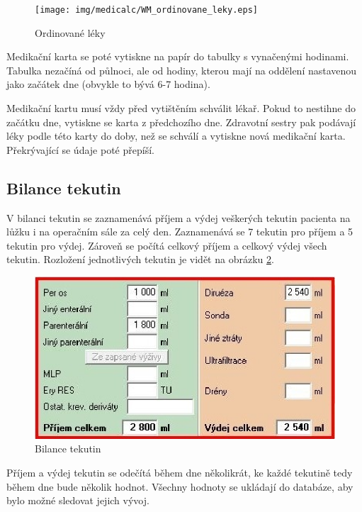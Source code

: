 \begin{figure}[H]
	\centering
	\texttt{[image: img/medicalc/WM\_ordinovane\_leky.eps]}
	\caption{Ordinované léky}
  \label{fig:WM_ordinovane_leky}
\end{figure}

Medikační karta se poté vytiskne na papír do tabulky s vynačenými hodinami. Tabulka nezačíná od půlnoci, ale od hodiny, kterou mají na oddělení nastavenou jako začátek dne (obvykle to bývá 6-7 hodina).

Medikační kartu musí vždy před vytištěním schválit lékař. Pokud to nestihne do začátku dne, vytiskne se karta z předchozího dne. Zdravotní sestry pak podávají léky podle této karty do doby, než se schválí a vytiskne nová medikační karta. Překrývající se údaje poté přepíší.

\subsection{Bilance tekutin}

V bilanci tekutin se zaznamenává příjem a výdej veškerých tekutin pacienta na lůžku i na operačním sále za celý den. Zaznamenává se 7 tekutin pro příjem a 5 tekutin pro výdej. Zároveň se počítá celkový příjem a celkový výdej všech tekutin. Rozložení jednotlivých tekutin je vidět na obrázku \ref{fig:WM_bilance_tekutin}.

\begin{figure}[H]
	\centering
	\includegraphics{img/medicalc/WM_bilance_tekutin.eps}
	\caption{Bilance tekutin}
  \label{fig:WM_bilance_tekutin}
\end{figure}


Příjem a výdej tekutin se odečítá během dne několikrát, ke každé tekutině tedy během dne bude několik hodnot. Všechny hodnoty se ukládají do databáze, aby bylo možné sledovat jejich vývoj.


